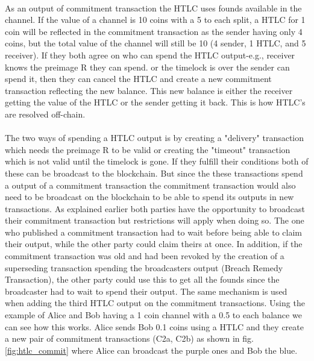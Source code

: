 \documentclass[informationsecurity]{gucmasterproject}
\begin{document}
\paragraph{}
As an output of commitment transaction the HTLC uses founds available in the channel. If the value of a channel is 10 coins with a 5 to each split, a HTLC for 1 coin will be reflected in the commitment transaction as the sender having only 4 coins, but the total value of the channel will still be 10 (4 sender, 1 HTLC, and 5 receiver). If they both agree on who can spend the HTLC output-e.g., receiver knows the preimage R they can spend. or the timelock is over the sender can spend it, then they can cancel the HTLC and create a new commitment transaction reflecting the new balance. This new balance is either the receiver getting the value of the HTLC or the sender getting it back. This is how HTLC's are resolved off-chain.

\paragraph{}
The two ways of spending a HTLC output is by creating a "delivery" transaction which needs the preimage R to be valid or creating the "timeout" transaction which is not valid until the timelock is gone. If they fulfill their conditions both of these can be broadcast to the blockchain. But since the these transactions spend a output of a commitment transaction the commitment transaction would also need to be broadcast on the blockchain to be able to spend its outputs in new transactions. As explained earlier both parties have the opportunity to broadcast their commitment transaction but restrictions will apply when doing so. The one who published a commitment transaction had to wait before being able to claim their output, while the other party could claim theirs at once. In addition, if the commitment transaction was old and had been revoked by the creation of a superseding transaction spending the
broadcasters output (Breach Remedy Transaction), the other party could use this to get all the founds since the broadcaster had to wait to spend their output.
The same mechanism is used when adding the third HTLC output on the commitment transactions. Using the example of Alice and Bob having a 1 coin channel with a 0.5 to each balance we can see how this works. Alice sends Bob 0.1 coins using a HTLC and they create a new pair of commitment transactions (C2a, C2b) as shown in fig.\ref{fig:htlc_commit} where Alice can broadcast the purple ones and Bob the blue.
\end{document}
